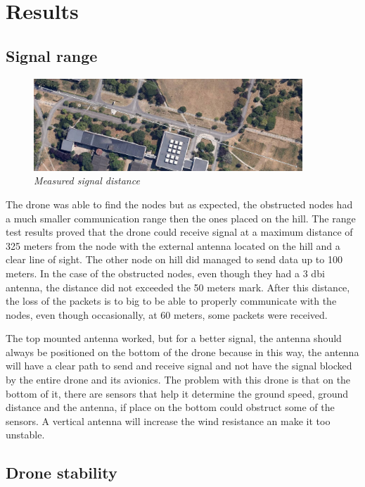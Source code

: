 \section{Results}


\subsection{Signal range}

\begin{figure}[ht]
\begin{center}
\includegraphics[width=0.9\textwidth]{img/distance.png}
\end{center}
\caption{\small \itshape{Measured signal distance}}
\end{figure}


The drone was able to find the nodes but as expected, the obstructed nodes had a much smaller communication range then the ones placed on the hill. The range test results proved that the drone could receive signal at a maximum distance of 325 meters from the node with the external antenna located on the hill and a clear line of sight. The other node on hill did managed to send data up to 100 meters. In the case of the obstructed nodes, even though they had a 3 dbi antenna, the distance did not exceeded the 50 meters mark. After this distance, the loss of the packets is to big to be able to properly communicate with the nodes, even though occasionally, at 60 meters, some packets were received.


The top mounted antenna worked, but for a better signal, the antenna should always be positioned on the bottom of the drone because in this way, the antenna will have a clear path to send and receive signal and not have the signal blocked by the entire drone and its avionics. The problem with this drone is that on the bottom of it, there are sensors that help it determine the ground speed, ground distance and the antenna, if place on the bottom could obstruct some of the sensors. A vertical antenna will increase the wind resistance an make it too unstable.


\subsection{Drone stability}

